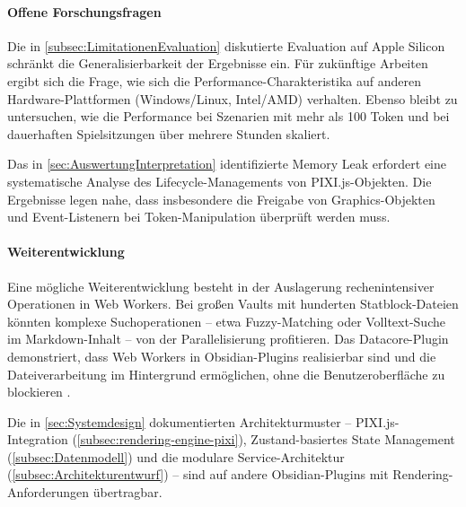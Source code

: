 \paragraph{Offene Forschungsfragen}

Die in \autoref{subsec:LimitationenEvaluation} diskutierte Evaluation auf Apple Silicon schränkt die Generalisierbarkeit der Ergebnisse ein. Für zukünftige Arbeiten ergibt sich die Frage, wie sich die Performance-Charakteristika auf anderen Hardware-Plattformen (Windows/Linux, Intel/AMD) verhalten. Ebenso bleibt zu untersuchen, wie die Performance bei Szenarien mit mehr als 100 Token und bei dauerhaften Spielsitzungen über mehrere Stunden skaliert.

Das in \autoref{sec:AuswertungInterpretation} identifizierte Memory Leak erfordert eine systematische Analyse des Lifecycle-Managements von PIXI.js-Objekten. Die Ergebnisse legen nahe, dass insbesondere die Freigabe von Graphics-Objekten und Event-Listenern bei Token-Manipulation überprüft werden muss.

\paragraph{Weiterentwicklung}

Eine mögliche Weiterentwicklung besteht in der Auslagerung rechenintensiver Operationen in Web Workers. Bei großen Vaults mit hunderten Statblock-Dateien könnten komplexe Suchoperationen -- etwa Fuzzy-Matching oder Volltext-Suche im Markdown-Inhalt -- von der Parallelisierung profitieren. Das Datacore-Plugin demonstriert, dass Web Workers in Obsidian-Plugins realisierbar sind und die Dateiverarbeitung im Hintergrund ermöglichen, ohne die Benutzeroberfläche zu blockieren \autocite{DatacoreWebWorker2024}.

Die in \autoref{sec:Systemdesign} dokumentierten Architekturmuster -- PIXI.js-Integration (\autoref{subsec:rendering-engine-pixi}), Zustand-basiertes State Management (\autoref{subsec:Datenmodell}) und die modulare Service-Architektur (\autoref{subsec:Architekturentwurf}) -- sind auf andere Obsidian-Plugins mit Rendering-Anforderungen übertragbar.
